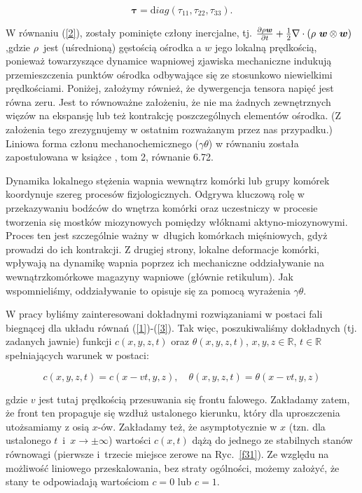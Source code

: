 \[ {\boldsymbol \tau} = {\mathrm diag}(\tau_{11},\tau_{22},\tau_{33}).\]

\noindent  W równaniu (\ref{2}), zostały pominięte człony inercjalne, tj. $\frac{\partial \rho {\boldsymbol w} }{\partial t} +  \frac{1}{2} \nabla \cdot ( \rho ~ {\boldsymbol w}\otimes {\boldsymbol w})$,gdzie $\rho$~jest (uśrednioną) gęstością ośrodka a $w$ jego lokalną prędkością, ponieważ towarzyszące dynamice wapniowej zjawiska mechaniczne indukują przemieszczenia punktów ośrodka odbywające się ze stosunkowo niewielkimi prędkościami. Poniżej, założymy również, że dywergencja tensora napięć jest równa zeru. Jest to równoważne założeniu, że nie ma żadnych zewnętrznych więzów na ekspansję lub też kontrakcję poszczególnych elementów ośrodka. (Z założenia tego zrezygnujemy w ostatnim rozważanym przez nas przypadku.) Liniowa forma członu mechanochemicznego ($\gamma \theta$) w równaniu została zapostulowana w książce \cite{Murray2007}, tom 2, równanie 6.72. 

\medskip 

Dynamika lokalnego stężenia wapnia wewnątrz komórki lub grupy komórek koordynuje szereg procesów fizjologicznych. Odgrywa kluczową rolę w przekazywaniu bodźców do wnętrza komórki oraz uczestniczy w procesie tworzenia się mostków miozynowych pomiędzy włóknami aktyno-miozynowymi. Proces ten jest szczególnie ważny w~długich komórkach mięśniowych, gdyż prowadzi do ich kontrakcji. Z drugiej strony, lokalne deformacje komórki, wpływają na dynamikę wapnia poprzez ich  mechaniczne oddziaływanie na wewnątrzkomórkowe magazyny wapniowe (głównie retikulum). Jak wspomnieliśmy, oddziaływanie to opisuje się za pomocą wyrażenia $\gamma \theta$. 

\medskip 

W pracy \cite{Kazmierczak2010} byliśmy zainteresowani dokładnymi rozwiązaniami w postaci fali biegnącej dla układu równań (\ref{1})-(\ref{3}). Tak więc, poszukiwaliśmy dokładnych (tj. zadanych jawnie) funkcji $c(x,y,z,t)$ oraz $\theta(x,y,z,t)$, $x,y,z \in \mathbb{R}$, $t \in \mathbb{R}$ spełniających warunek w postaci:  

\begin{equation} \label{ansatz}
c(x,y,z,t) = c(x-vt,y,z), \quad \theta(x,y,z,t) = \theta(x-vt,y,z)
\end{equation}

\noindent gdzie $v$ jest tutaj prędkością przesuwania się frontu falowego. Zakładamy zatem, że front ten propaguje się wzdłuż ustalonego kierunku, który dla uproszczenia utożsamiamy z osią $x$-ów. Zakładamy też, że asymptotycznie w $x$ (tzn. dla ustalonego $t$~i~$x \to \pm \infty$) wartości  $c(x,t)$ dążą do jednego ze stabilnych stanów równowagi (pierwsze i~trzecie miejsce zerowe na Ryc.~\ref{f31}). Ze względu na możliwość liniowego przeskalowania, bez straty ogólności, możemy założyć, że stany te odpowiadają wartościom  $c=0$ lub $c=1$.

